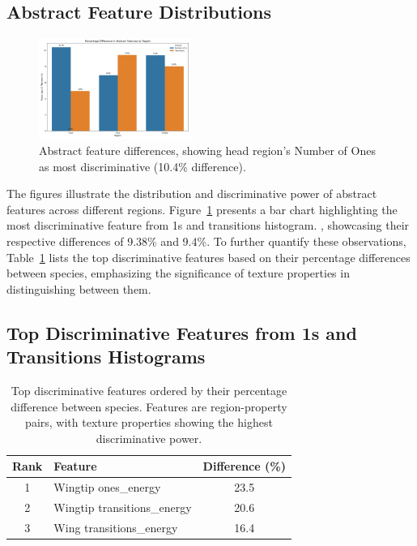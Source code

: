 \documentclass[a4paper,12pt]{report}
\begin{document}
\subsection{Abstract Feature Distributions}
\begin{figure}[htbp]
    \centering
    \includegraphics[width=0.44\textwidth]{images/LBP/default_feature_diff_barchart.png}
    \caption{Abstract feature differences, showing head region's Number of Ones as most discriminative (10.4\% difference).}
    \label{fig:abstract_features}
\end{figure}



The figures illustrate the distribution and discriminative power of abstract features across different regions. Figure~\ref{fig:abstract_features} presents a bar chart highlighting the most discriminative feature from 1s and transitions histogram. , showcasing their respective differences of 9.38\% and 9.4\%. To further quantify these observations, Table~\ref{tab:top_discriminative_features} lists the top discriminative features based on their percentage differences between species, emphasizing the significance of texture properties in distinguishing between them.

\subsection{Top Discriminative Features from 1s and Transitions Histograms}
\begin{table}[htbp]
    \centering
    \begin{tabular}{clc}
        \hline
        Rank & Feature & Difference (\%) \\
        \hline
        1 & Wingtip ones\_energy & 23.5 \\
        2 & Wingtip transitions\_energy & 20.6 \\
        3 & Wing transitions\_energy & 16.4 \\
        \hline
    \end{tabular}
    \caption{Top discriminative features ordered by their percentage difference between species. Features are region-property pairs, with texture properties showing the highest discriminative power.}
    \label{tab:top_discriminative_features}
\end{table}
\end{document}

